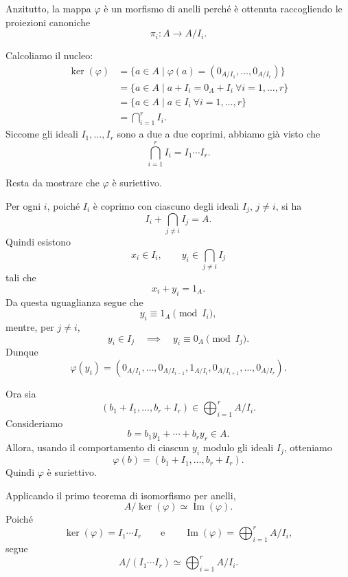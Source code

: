 \documentclass[a4paper]{article}
\begin{document}
\begin{radioactive}
\begin{snippetproof}{}
    Anzitutto, la mappa \(\varphi\) è un morfismo di anelli perché è ottenuta raccogliendo le proiezioni canoniche
    \[
        \pi_i\colon A\to A/I_i.
    \]

    Calcoliamo il nucleo:
    \begin{align*}
        \ker(\varphi)
        &=
        \{a\in A\mid \varphi(a)=(0_{A/I_1},\ldots,0_{A/I_r})\} \\
        &=
        \{a\in A\mid a+I_i=0_A+I_i \ \forall i=1,\ldots,r\} \\
        &=
        \{a\in A\mid a\in I_i \ \forall i=1,\ldots,r\} \\
        &=
        \bigcap_{i=1}^r I_i.
    \end{align*}
    Siccome gli ideali \(I_1,\ldots,I_r\) sono a due a due coprimi, abbiamo già visto che
    \[
        \bigcap_{i=1}^r I_i=I_1\cdots I_r.
    \]

    Resta da mostrare che \(\varphi\) è suriettivo.

    Per ogni \(i\), poiché \(I_i\) è coprimo con ciascuno degli ideali \(I_j\), \(j\neq i\), si ha
    \[
        I_i+\bigcap_{j\neq i} I_j=A.
    \]
    Quindi esistono
    \[
        x_i\in I_i,
        \qquad
        y_i\in \bigcap_{j\neq i}I_j
    \]
    tali che
    \[
        x_i+y_i=1_A.
    \]
    Da questa uguaglianza segue che
    \[
        y_i\equiv 1_A \pmod{I_i},
    \]
    mentre, per \(j\neq i\),
    \[
        y_i\in I_j
        \quad\implies\quad
        y_i\equiv 0_A \pmod{I_j}.
    \]
    Dunque
    \[
        \varphi(y_i)
        =
        (0_{A/I_1},\ldots,0_{A/I_{i-1}},1_{A/I_i},0_{A/I_{i+1}},\ldots,0_{A/I_r}).
    \]

    Ora sia
    \[
        (b_1+I_1,\ldots,b_r+I_r)
        \in
        \bigoplus_{i=1}^r A/I_i.
    \]
    Consideriamo
    \[
        b=b_1y_1+\cdots+b_ry_r\in A.
    \]
    Allora, usando il comportamento di ciascun \(y_i\) modulo gli ideali \(I_j\), otteniamo
    \[
        \varphi(b)
        =
        (b_1+I_1,\ldots,b_r+I_r).
    \]
    Quindi \(\varphi\) è suriettivo.

    Applicando il primo teorema di isomorfismo per anelli,
    \[
        A/\ker(\varphi)
        \simeq
        \operatorname{Im}(\varphi).
    \]
    Poiché
    \[
        \ker(\varphi)=I_1\cdots I_r
        \qquad
        \text{e}
        \qquad
        \operatorname{Im}(\varphi)=\bigoplus_{i=1}^r A/I_i,
    \]
    segue
    \[
        A/(I_1\cdots I_r)
        \simeq
        \bigoplus_{i=1}^r A/I_i.
    \]
\end{snippetproof}
\end{radioactive}
\end{document}
